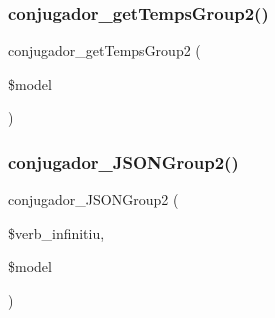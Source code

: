 \subsubsection{\texorpdfstring{conjugador\+\_\+get\+Temps\+Group2()}{conjugador\_getTempsGroup2()}}
{\footnotesize\ttfamily conjugador\+\_\+get\+Temps\+Group2 (\begin{DoxyParamCaption}\item[{}]{\$model }\end{DoxyParamCaption})}

\hypertarget{conjugador__gr2_8inc_a23811a826aba996459214db8b2176a60}{}\label{conjugador__gr2_8inc_a23811a826aba996459214db8b2176a60} 
\subsubsection{\texorpdfstring{conjugador\+\_\+\+J\+S\+O\+N\+Group2()}{conjugador\_JSONGroup2()}}
{\footnotesize\ttfamily conjugador\+\_\+\+J\+S\+O\+N\+Group2 (\begin{DoxyParamCaption}\item[{}]{\$verb\+\_\+infinitiu,  }\item[{}]{\$model }\end{DoxyParamCaption})}

